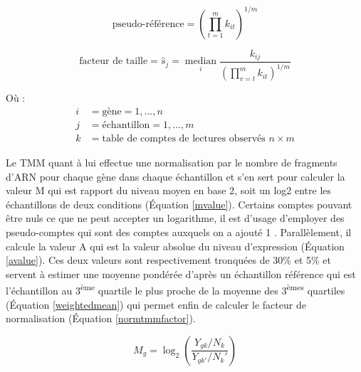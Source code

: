 
\begin{equation}\label{pseudoref}
    \text{pseudo-référence} = \left(\prod_{t=1}^{m} k_{i t}\right)^{1 / m}
\end{equation}

\begin{equation}\label{sizefactor}
    \text{facteur de taille} = \hat{s}_{j}=\underset{i}{\operatorname{median}} \frac{k_{i j}}{\left(\prod_{v=t}^{m} k_{i t}\right)^{1 / m}}
\end{equation}


Où :
\begin{align*}
i & = \text{gène} = 1,..., n \\
j & = \text{échantillon} = 1,..., m \\
k & = \text{table de comptes de lectures observés } n \times m 
\end{align*}

Le \acrshort{TMM} quant à lui effectue une normalisation par le nombre de fragments d'ARN pour chaque gène dans chaque échantillon et s'en sert pour calculer la valeur M qui est rapport du niveau moyen en base 2, soit un log2 entre les échantillons de deux conditions (Équation \ref{mvalue}). Certains comptes pouvant être nuls ce que ne peut accepter un logarithme, il est d'usage d'employer des pseudo-comptes qui sont des comptes auxquels on a ajouté 1 \cite{Booeshaghi2021Mar}. Parallèlement, il calcule la valeur A qui est la valeur absolue du niveau d'expression (Équation \ref{avalue}). Ces deux valeurs sont respectivement tronquées de 30\% et 5\% et servent à estimer une moyenne pondérée d'après un échantillon référence qui est l'échantillon au 3\textsuperscript{ème} quartile le plus proche de la moyenne des 3\textsuperscript{èmes} quartiles (Équation \ref{weightedmean}) qui permet enfin de calculer le facteur de normalisation (Équation \ref{normtmmfactor}).

\begin{equation}\label{mvalue}
    M_g = \log_{2} \left(\frac{Y_{gk} / N_k}{Y_{gk'} / N_k'}\right)
\end{equation}

